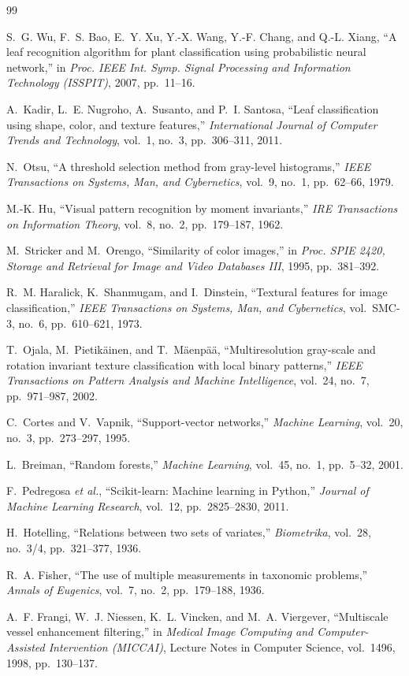 \documentclass[11pt,a4paper]{article}
\begin{document}
\begin{thebibliography}{99}

S.~G. Wu, F.~S. Bao, E.~Y. Xu, Y.-X. Wang, Y.-F. Chang, and Q.-L. Xiang, ``A leaf recognition
algorithm for plant classification using probabilistic neural network,'' in \emph{Proc. IEEE Int.
Symp. Signal Processing and Information Technology (ISSPIT)}, 2007, pp.~11--16.

A.~Kadir, L.~E. Nugroho, A.~Susanto, and P.~I. Santosa, ``Leaf classification using shape, color,
and texture features,'' \emph{International Journal of Computer Trends and Technology}, vol.~1,
no.~3, pp.~306--311, 2011.

N.~Otsu, ``A threshold selection method from gray-level histograms,'' \emph{IEEE Transactions on
Systems, Man, and Cybernetics}, vol.~9, no.~1, pp.~62--66, 1979.

M.-K. Hu, ``Visual pattern recognition by moment invariants,'' \emph{IRE Transactions on
Information Theory}, vol.~8, no.~2, pp.~179--187, 1962.

M.~Stricker and M.~Orengo, ``Similarity of color images,'' in \emph{Proc. SPIE 2420, Storage and
Retrieval for Image and Video Databases III}, 1995, pp.~381--392.

R.~M. Haralick, K.~Shanmugam, and I.~Dinstein, ``Textural features for image classification,''
\emph{IEEE Transactions on Systems, Man, and Cybernetics}, vol.~SMC-3, no.~6, pp.~610--621, 1973.

T.~Ojala, M.~Pietikäinen, and T.~Mäenpää, ``Multiresolution gray-scale and rotation invariant
texture classification with local binary patterns,'' \emph{IEEE Transactions on Pattern Analysis
and Machine Intelligence}, vol.~24, no.~7, pp.~971--987, 2002.

C.~Cortes and V.~Vapnik, ``Support-vector networks,'' \emph{Machine Learning}, vol.~20, no.~3,
pp.~273--297, 1995.

L.~Breiman, ``Random forests,'' \emph{Machine Learning}, vol.~45, no.~1, pp.~5--32, 2001.

F.~Pedregosa \emph{et al.}, ``Scikit-learn: Machine learning in Python,'' \emph{Journal of Machine
Learning Research}, vol.~12, pp.~2825--2830, 2011.

H.~Hotelling, ``Relations between two sets of variates,'' \emph{Biometrika}, vol.~28, no.~3/4,
pp.~321--377, 1936.

R.~A. Fisher, ``The use of multiple measurements in taxonomic problems,'' \emph{Annals of
Eugenics}, vol.~7, no.~2, pp.~179--188, 1936.

A.~F. Frangi, W.~J. Niessen, K.~L. Vincken, and M.~A. Viergever, ``Multiscale vessel enhancement
filtering,'' in \emph{Medical Image Computing and Computer-Assisted Intervention (MICCAI)}, Lecture
Notes in Computer Science, vol.~1496, 1998, pp.~130--137.

\end{thebibliography}
\end{document}
